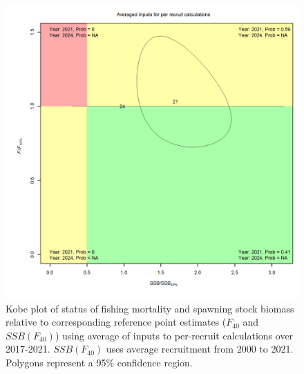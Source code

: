 \documentclass[
]{article}
\begin{document}
\begin{figure}

{\centering \includegraphics[width=1\linewidth]{../2023.RT.Runs/Run34/projections/plots_png/ref_points/Kobe_status} 

}

\caption{Kobe plot of status of fishing mortality and spawning stock biomass relative to corresponding reference point estimates ($F_{40}$ and $SSB(F_{40})$) using average of inputs to per-recruit calculations over 2017-2021. $SSB(F_{40})$ uses average recruitment from 2000 to 2021. Polygons represent a 95\% confidence region.}\label{fig:kobe-status-proj}
\end{figure}

\clearpage
\end{document}
